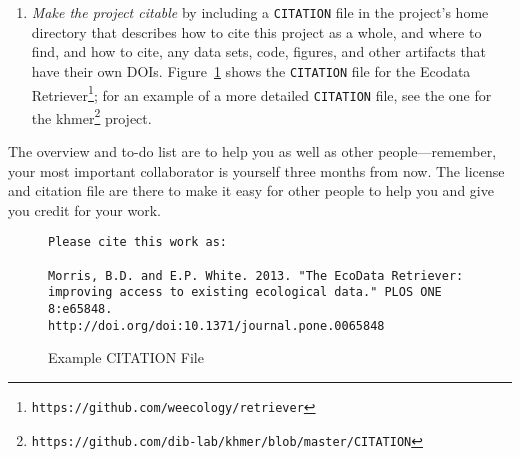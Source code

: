 \documentclass[10pt]{article}
\newcommand{\recommend}[1]{\textit{#1}}
\newcommand{\withurl}[2]{{#1}\footnote{\texttt{#2}}}
\begin{document}
\begin{enumerate}
  \begin{framed}
    \noindent \textbf{What Not To Do}

    We recommend \emph{against} the ``no commercial use'' variations
    of the Creative Commons licenses because they may impede some
    forms of re-use.  For example, if a researcher in a developing
    country is being paid by her government to compile a public health
    report, and wishes to include some of your data, she will be
    unable to do so if the license says ``non-commercial''. We
    recommend permissive software licenses rather than the
    \withurl{GNU General Public
      License}{https://www.safaribooksonline.com/library/view/understanding-open-source/0596005814/ch03.html}
    (GPL) because it is easier to integrate permissively-licensed
    software into other projects. (Note that it is straightforward to
    switch from a permissive license to the GPL if you should change
    your mind later but rather more complicated to go in the other
    direction.)
  \end{framed}

\item
  \recommend{Make the project citable} by including a
  \texttt{CITATION} file in the project's home directory that
  describes how to cite this project as a whole, and where to find,
  and how to cite, any data sets, code, figures, and other artifacts
  that have their own DOIs.  Figure~\ref{fig:citation} shows the
  \texttt{CITATION} file for the \withurl{Ecodata
    Retriever}{https://github.com/weecology/retriever}; for an example
  of a more detailed \texttt{CITATION} file, see the one for the
  \withurl{khmer}{https://github.com/dib-lab/khmer/blob/master/CITATION}
  project.

\end{enumerate}

The overview and to-do list are to help you as well as other
people---remember, your most important collaborator is yourself three
months from now. The license and citation file are there to make it
easy for other people to help you and give you credit for your work.

\begin{figure}
\begin{verbatim}
Please cite this work as:

Morris, B.D. and E.P. White. 2013. "The EcoData Retriever:
improving access to existing ecological data." PLOS ONE 8:e65848.
http://doi.org/doi:10.1371/journal.pone.0065848
\end{verbatim}
\caption{Example CITATION File}
\label{fig:citation}
\end{figure}
\end{document}
